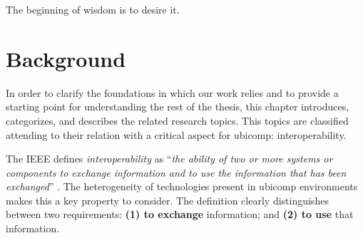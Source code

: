 
\begin{savequote}[50mm]
The beginning of wisdom is to desire it.
\end{savequote}


\chapter{Background}
\label{cha:background}

\ifpdf
    \graphicspath{{\pathchaptwo/figures/PNG/}{\pathchaptwo/figures/PDF/}{\pathchaptwo/figures/}}
\else
    \graphicspath{{\pathchaptwo/figures/EPS/}{\pathchaptwo/figures/}}
\fi



In order to clarify the foundations in which our work relies and to provide a starting point for understanding the rest of the thesis,
this chapter introduces, categorizes, and describes the related research topics. %
This topics are classified attending to their relation with a critical aspect for \ac{ubicomp}: interoperability.



The IEEE defines \emph{interoperability} as ``\emph{the ability of two or more systems or components to exchange information and to use the information that has been exchanged}'' \citep{_ieee_1990}.
The heterogeneity of technologies present in \ac{ubicomp} environments makes this a key property to consider.
The definition clearly distinguishes between two requirements: %
\textbf{(1) to exchange} information; and
\textbf{(2) to use} that information. %

\medskip


